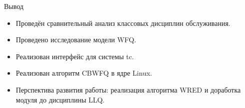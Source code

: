 \documentclass[12pt]{beamer}
\begin{document}
\begin{frame}{Вывод}
	\begin{itemize}
		\item Проведён сравнительный анализ классовых дисциплин обслуживания.
		\item Проведено исследование модели WFQ.
		\item Реализован интерфейс для системы tc.
		\item Реализован алгоритм CBWFQ в ядре Linux.
		\item Перспектива развития работы: реализация алгоритма WRED и доработка модуля до дисциплины LLQ.
	\end{itemize}
\end{frame}

\itmothankyou
\end{document}

